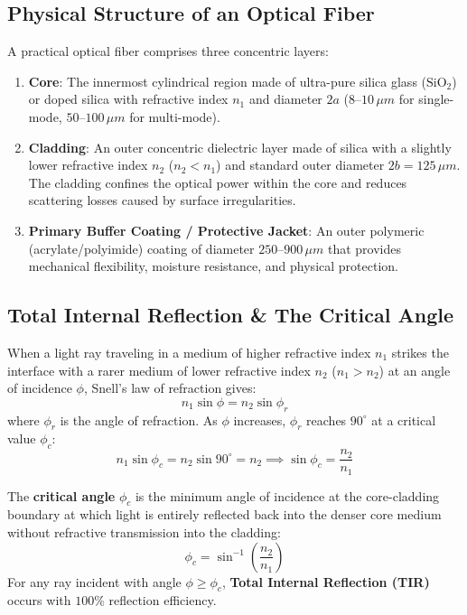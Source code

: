 \subsection{Physical Structure of an Optical Fiber}
A practical optical fiber comprises three concentric layers:
\begin{enumerate}
    \item \textbf{Core}: The innermost cylindrical region made of ultra-pure silica glass ($\text{SiO}_2$) or doped silica with refractive index $n_1$ and diameter $2a$ ($8\text{--}10\,\si{\mu m}$ for single-mode, $50\text{--}100\,\si{\mu m}$ for multi-mode).
    \item \textbf{Cladding}: An outer concentric dielectric layer made of silica with a slightly lower refractive index $n_2$ ($n_2 < n_1$) and standard outer diameter $2b = 125\,\si{\mu m}$. The cladding confines the optical power within the core and reduces scattering losses caused by surface irregularities.
    \item \textbf{Primary Buffer Coating / Protective Jacket}: An outer polymeric (acrylate/polyimide) coating of diameter $250\text{--}900\,\si{\mu m}$ that provides mechanical flexibility, moisture resistance, and physical protection.
\end{enumerate}

\subsection{Total Internal Reflection \& The Critical Angle}
When a light ray traveling in a medium of higher refractive index $n_1$ strikes the interface with a rarer medium of lower refractive index $n_2$ ($n_1 > n_2$) at an angle of incidence $\phi$, Snell's law of refraction gives:
\begin{equation}
    n_1 \sin\phi = n_2 \sin\phi_r
\end{equation}
where $\phi_r$ is the angle of refraction. As $\phi$ increases, $\phi_r$ reaches $90^\circ$ at a critical value $\phi_c$:
\begin{equation}
    n_1 \sin\phi_c = n_2 \sin 90^\circ = n_2 \implies \sin\phi_c = \frac{n_2}{n_1}
\end{equation}

\begin{definition}
The \textbf{critical angle} $\phi_c$ is the minimum angle of incidence at the core-cladding boundary at which light is entirely reflected back into the denser core medium without refractive transmission into the cladding:
\begin{equation}
    \phi_c = \sin^{-1}\left(\frac{n_2}{n_1}\right)
\end{equation}
For any ray incident with angle $\phi \ge \phi_c$, \textbf{Total Internal Reflection (TIR)} occurs with $100\%$ reflection efficiency.
\end{definition}


